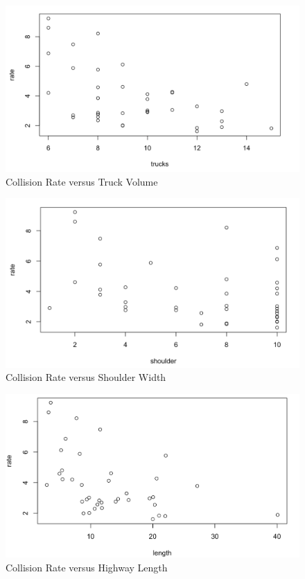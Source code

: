 \documentclass[12pt]{report}
\begin{document}
\begin{figure}[H]
    \centering
    \includegraphics[width=1\textwidth]{Preliminary graphs/ST562 rate vs trucks.png}
    \caption{Collision Rate versus Truck Volume} \label{fig:PG6}
\end{figure}
\noindent

\begin{figure}[H]
    \centering
    \includegraphics[width=1\textwidth]{Preliminary graphs/ST562 rate vs shoulder.png}
    \caption{Collision Rate versus Shoulder Width} \label{fig:PG7}
\end{figure}
\noindent

\begin{figure}[H]
    \centering
    \includegraphics[width=1\textwidth]{Preliminary graphs/ST562 Rate vs Length.png}
    \caption{Collision Rate versus Highway Length} \label{fig:PG8}
\end{figure}
\noindent
\end{document}
